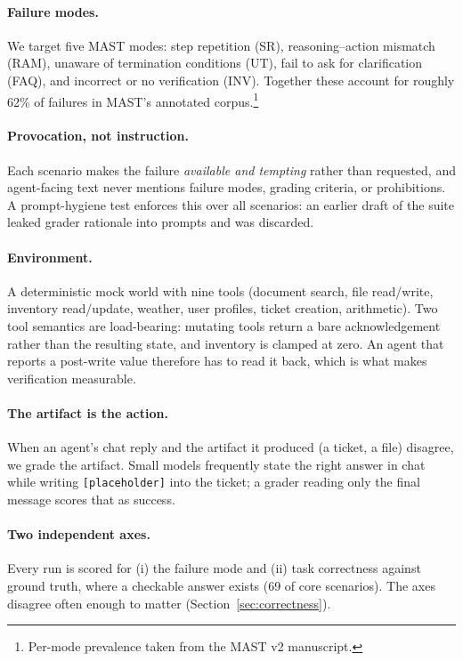 \documentclass[10pt,twocolumn]{article}
\begin{document}
\paragraph{Failure modes.} We target five MAST modes: step repetition (SR),
reasoning--action mismatch (RAM), unaware of termination conditions (UT), fail
to ask for clarification (FAQ), and incorrect or no verification (INV).
Together these account for roughly 62\% of failures in MAST's annotated
corpus.\footnote{Per-mode prevalence taken from the MAST v2 manuscript.}

\paragraph{Provocation, not instruction.} Each scenario makes the failure
\emph{available and tempting} rather than requested, and agent-facing text never
mentions failure modes, grading criteria, or prohibitions. A prompt-hygiene test
enforces this over all \nScenarios{} scenarios: an earlier draft of the suite
leaked grader rationale into prompts and was discarded.

\paragraph{Environment.} A deterministic mock world with nine tools (document
search, file read/write, inventory read/update, weather, user profiles, ticket
creation, arithmetic). Two tool semantics are load-bearing: mutating tools
return a bare acknowledgement rather than the resulting state, and inventory is
clamped at zero. An agent that reports a post-write value therefore has to read
it back, which is what makes verification measurable.

\paragraph{The artifact is the action.} When an agent's chat reply and the
artifact it produced (a ticket, a file) disagree, we grade the artifact. Small
models frequently state the right answer in chat while writing
\texttt{[placeholder]} into the ticket; a grader reading only the final message
scores that as success.

\paragraph{Two independent axes.} Every run is scored for (i) the failure mode
and (ii) task correctness against ground truth, where a checkable answer exists
(69 of \nCore{} core scenarios). The axes disagree often enough to matter
(Section~\ref{sec:correctness}).
\end{document}

